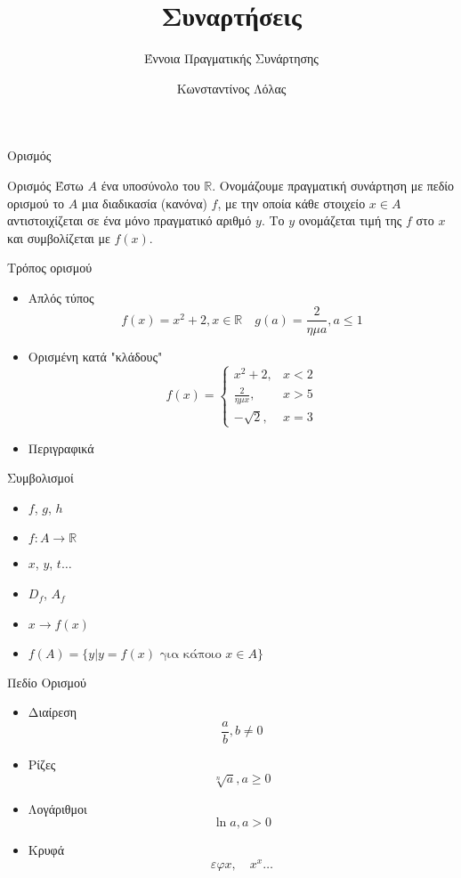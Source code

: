 \documentclass[greek]{beamer}
\title{Συναρτήσεις}
\subtitle{Έννοια Πραγματικής Συνάρτησης}
\author[Λόλας]{Κωνσταντίνος Λόλας}
\institute[$10^ο$ ΓΕΛ]{$10^ο$ ΓΕΛ Θεσσαλονίκης}
\date{}
\begin{document}
\begin{frame}
      \titlepage
\end{frame}
\begin{frame}{Ορισμός}
      \begin{block}{Ορισμός}
            Έστω $Α$ ένα υποσύνολο του $\mathbb{R}$. Ονομάζουμε πραγματική συνάρτηση με πεδίο ορισμού το $Α$ μια διαδικασία (κανόνα) $f$, με την οποία κάθε στοιχείο $x\in A$ αντιστοιχίζεται σε ένα μόνο πραγματικό αριθμό $y$. Το $y$ ονομάζεται τιμή της $f$ στο $x$ και συμβολίζεται με $f(x)$.
      \end{block}
\end{frame}

\begin{frame}{Τρόπος ορισμού}
      \begin{itemize}
            \item<1-> Απλός τύπος
                  $$f(x)=x^2+2,x\in\mathbb{R}\quad g(a)=\frac{2}{ημa}, a\le1$$
            \item<2-> Ορισμένη κατά "κλάδους"
                  $$
                        f(x)=
                        \begin{cases}
                              x^2+2,         & x<2 \\
                              \frac{2}{ημx}, & x>5 \\
                              -\sqrt{2},     & x=3
                        \end{cases}
                  $$
            \item<3-> Περιγραφικά
      \end{itemize}
\end{frame}

\begin{frame}{Συμβολισμοί}
      \begin{itemize}
            \item $f$, $g$, $h$
            \item $f:A\to\mathbb{R}$
            \item $x$, $y$, $t\ldots$
            \item $D_f$, $A_f$
            \item $x\to f(x)$
            \item $f(A)=\{y| y=f(x)\text{ για κάποιο }x\in A\}$
      \end{itemize}
\end{frame}

\begin{frame}{Πεδίο Ορισμού}
      \begin{itemize}
            \item<1-> Διαίρεση
                  $$\frac{a}{b},b\ne 0$$
            \item<2-> Ρίζες
                  $$\sqrt[n]{a},a\ge 0$$
            \item<3-> Λογάριθμοι
                  $$\ln a,a > 0$$
            \item<4-> Κρυφά
                  $$εφx,\quad x^x\ldots$$
      \end{itemize}
\end{frame}
\end{document}
